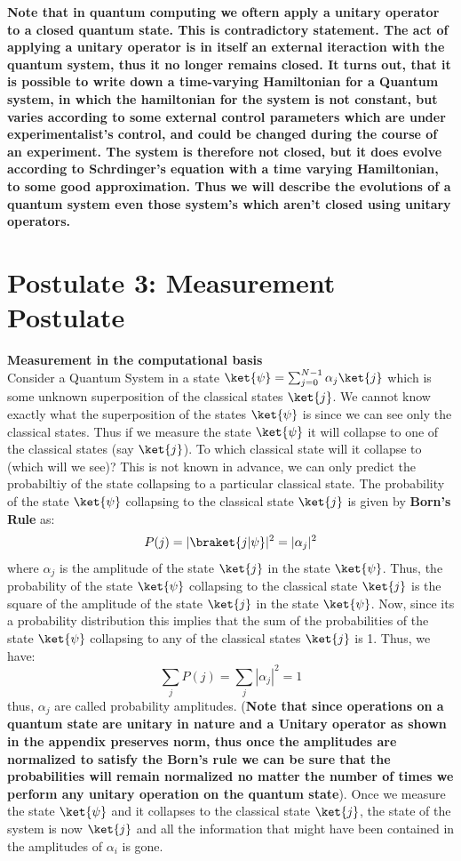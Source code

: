 \documentclass[12pt, oneside]{book}
\theoremstyle{definition}
\theoremstyle{definition}
\theoremstyle{remark}
\begin{document}
\textbf{Note that in quantum computing we oftern apply a unitary operator to a closed quantum state. This is contradictory statement.
The act of applying a unitary operator is in itself an external iteraction with the quantum system, thus it no longer remains closed. 
It turns out, that it is possible to write down a time-varying Hamiltonian for a Quantum system, in which the hamiltonian for the system is not constant,
but varies according to some external control parameters which are under experimentalist's control, and could be changed during the 
course of an experiment. The system is therefore not closed, but it does evolve according to Schrdinger's equation with a time varying Hamiltonian, to some good
approximation. Thus we will describe the evolutions of a quantum system even those system's which aren't closed using unitary operators.}

\section{Postulate 3: Measurement Postulate}
\textbf{Measurement in the computational basis}\\
Consider a Quantum System in a state $\ket{\psi} = \sum_{j=0}^{N-1} \alpha_j \ket{j}$ which is some unknown superposition of the classical states $\ket{j}$. We cannot know exactly what the superposition of the states $\ket{\psi}$ is
since we can see only the classical states. Thus if we measure the state $\ket{\psi}$ it will collapse to one of the classical states
(say $\ket{j}$). To which classical state will it collapse to (which will we see)? This is not known in advance, we can
only predict the probabiltiy of the state collapsing to a particular classical state. The probability of the state $\ket{\psi}$ collapsing to the classical state $\ket{j}$ is given by
\textbf{Born's Rule} as:
\[
    P(j)=|\braket{j|\psi}|^2=|\alpha_j|^2
\]
where $\alpha_j$ is the amplitude of the state $\ket{j}$ in the state $\ket{\psi}$. Thus, the probability of the state $\ket{\psi}$ collapsing to the classical state $\ket{j}$ is the square of the amplitude of the state $\ket{j}$ in the state $\ket{\psi}$.
Now, since its a probability distribution this implies that the sum of the probabilities of the state $\ket{\psi}$ collapsing to any of the classical states $\ket{j}$ is 1. Thus, we have:
\[
    \sum_{j}P(j)=\sum_{j}|\alpha_j|^2=1
\]
thus, $\alpha_j$ are called probability amplitudes. (\textbf{Note that since operations on a quantum state are unitary in nature and 
a Unitary operator as shown in the appendix preserves norm, thus once the amplitudes are normalized to satisfy the Born's rule we can be sure that the probabilities will remain normalized no matter the number
of times we perform any unitary operation on the quantum state}). Once we measure the state 
$\ket{\psi}$ and it collapses to the classical state $\ket{j}$, the state of the system is now $\ket{j}$ and all the information that might have been contained in the amplitudes of $\alpha_i$ is gone.
\end{document}
